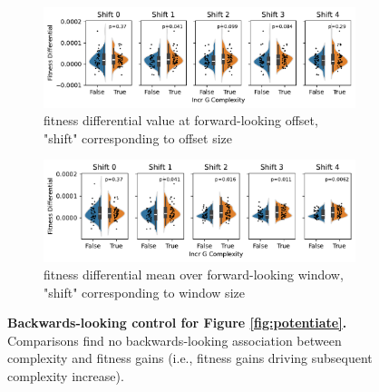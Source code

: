 \begin{figure}

\begin{subfigure}{\linewidth}

\includegraphics[width=\linewidth]{binder-2025-08-28-complexity-adaptation/binder/teeplots/2025-08-28-complexity-adaptation/how=shift+sign=-1+viz=subplots+ext=.pdf}
\caption{fitness differential value at forward-looking offset, "shift" corresponding to offset size}

\end{subfigure}

\vspace{2ex}

\begin{subfigure}{\linewidth}

\includegraphics[width=\linewidth]{binder-2025-08-28-complexity-adaptation/binder/teeplots/2025-08-28-complexity-adaptation/how=rollingmean+sign=-1+viz=subplots+ext=.pdf}
\caption{fitness differential mean over forward-looking window, "shift" corresponding to window size}

\end{subfigure}

\vspace{1ex}

\caption{
\textbf{Backwards-looking control for Figure \ref{fig:potentiate}.}
Comparisons find no backwards-looking association between complexity and fitness gains (i.e., fitness gains driving subsequent complexity increase).
}
\label{fig:potentiate-control}

\end{figure}

